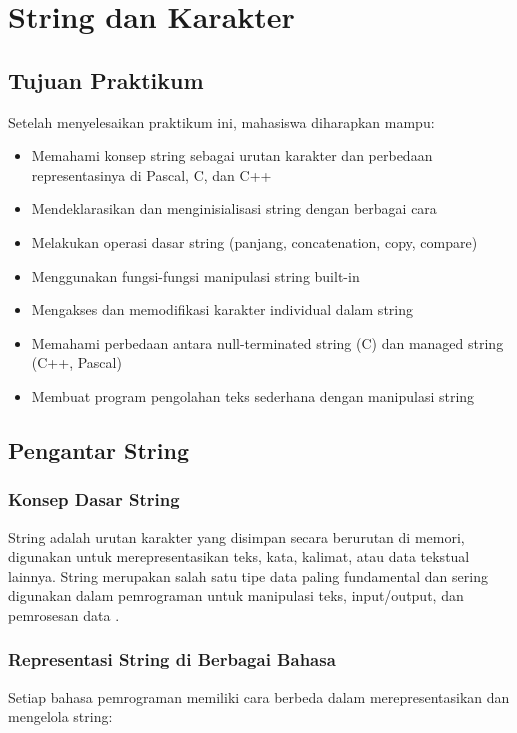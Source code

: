\documentclass[../main.tex]{subfiles}
\begin{document}
\chapter{String dan Karakter}

\section*{Tujuan Praktikum}
Setelah menyelesaikan praktikum ini, mahasiswa diharapkan mampu:
\begin{itemize}
  \item Memahami konsep string sebagai urutan karakter dan perbedaan representasinya di Pascal, C, dan C++
  \item Mendeklarasikan dan menginisialisasi string dengan berbagai cara
  \item Melakukan operasi dasar string (panjang, concatenation, copy, compare)
  \item Menggunakan fungsi-fungsi manipulasi string built-in
  \item Mengakses dan memodifikasi karakter individual dalam string
  \item Memahami perbedaan antara null-terminated string (C) dan managed string (C++, Pascal)
  \item Membuat program pengolahan teks sederhana dengan manipulasi string
\end{itemize}

\section{Pengantar String}

\subsection{Konsep Dasar String}
String adalah urutan karakter yang disimpan secara berurutan di memori, digunakan untuk merepresentasikan teks, kata, kalimat, atau data tekstual lainnya. String merupakan salah satu tipe data paling fundamental dan sering digunakan dalam pemrograman untuk manipulasi teks, input/output, dan pemrosesan data \parencite{pascal-tutorial-wikibooks,iso-c-draft-n1570,cpp-strings,tutorialspoint-c-strings}.

\subsection{Representasi String di Berbagai Bahasa}

Setiap bahasa pemrograman memiliki cara berbeda dalam merepresentasikan dan mengelola string:
\end{document}
